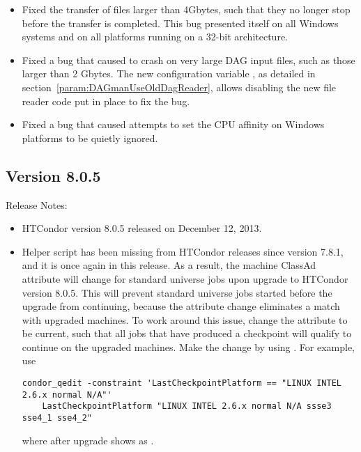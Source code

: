\begin{itemize}
\item Fixed the transfer of files larger than 4Gbytes,
such that they no longer stop before the transfer is completed.
This bug presented itself on all Windows systems and on all
platforms running on a 32-bit architecture.

\item Fixed a bug that caused  to crash on very
large DAG input files, such as those larger than 2 Gbytes.
The new configuration variable ,
as detailed in section~\ref{param:DAGmanUseOldDagReader},
allows disabling the new file reader code put in place to fix the bug.

\item Fixed a bug that caused attempts to set the CPU affinity 
on Windows platforms to be quietly ignored.

\end{itemize}

\subsection*{\label{sec:New-8-0-5}Version 8.0.5}

\noindent Release Notes:

\begin{itemize}

\item HTCondor version 8.0.5 released on December 12, 2013.

\item Helper script  has been missing
from HTCondor releases since version 7.8.1, and it is once again 
in this release.
As a result, the machine ClassAd attribute 
will change for standard universe jobs upon upgrade to HTCondor version 8.0.5.
This will prevent standard universe jobs started before the upgrade
from continuing, because the attribute change eliminates a match 
with upgraded machines. 
To work around this issue,
change the  attribute to be current,
such that all jobs that have produced a checkpoint will qualify to 
continue on the upgraded machines.
Make the change by using . 
For example, use
\footnotesize
\begin{verbatim}
condor_qedit -constraint 'LastCheckpointPlatform == "LINUX INTEL 2.6.x normal N/A"'
    LastCheckpointPlatform "LINUX INTEL 2.6.x normal N/A ssse3 sse4_1 sse4_2"
\end{verbatim}
\normalsize
where  after upgrade shows as
.

\end{itemize}


